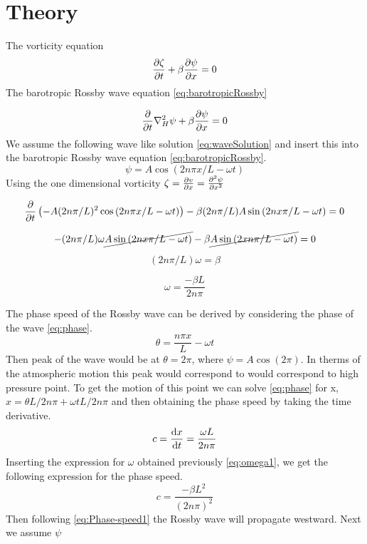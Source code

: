 \section{Theory}
The vorticity equation
\begin{equation}\label{eq:gov_vort}
    \pdv{\zeta}{t} + \beta \pdv{\psi}{x} = 0
\end{equation}
The barotropic Rossby wave equation \cref{eq:barotropicRossby}

\begin{equation}\label{eq:barotropicRossby}
    \frac{\partial}{\partial t}{} \nabla_H^2 \psi + \beta \pdv{\psi}{x} = 0 
\end{equation}
We assume the following wave like solution \cref{eq:waveSolution} and 
insert this into the barotropic Rossby wave equation \cref{eq:barotropicRossby}.
\begin{equation}\label{eq:waveSolution}
    \psi = A\cos{(2n\pi x /L - \omega t)}
\end{equation}
Using the one dimensional vorticity $\zeta = \pdv{v}{x} = \pdv[2]{\psi}{x}$ 

\begin{equation}
    \pdv{}{t} \left(-A (2n\pi/L)^2  \cos{(2n\pi x/L - \omega t)}\right) - \beta 
     (2n\pi/L) A \sin{(2n x\pi/L - \omega t) = 0}
\end{equation}

\begin{equation}
    -(2n\pi/L)\omega \cancel{A\sin{(2n x\pi/L - \omega t)}} - \beta 
    \cancel{A\sin{(2 xn\pi/L - \omega t)}} = 0
\end{equation}

\begin{equation}
    (2n\pi / L) \omega = \beta
\end{equation}

\begin{equation}\label{eq:omega1}
    \omega = \frac{-\beta L}{2n\pi} 
\end{equation}

The phase speed of the Rossby wave can be derived by considering the phase of
the wave \cref{eq:phase}.
\begin{equation}\label{eq:phase}
    \theta = \frac{n \pi x}{L} - \omega t
\end{equation} 
Then peak of the wave would be at $\theta = 2\pi$, where $\psi = A\cos{(2\pi)}$.
In therms of the atmospheric motion this peak would correspond to would
correspond to high pressure point. To get the motion of this point we can solve
\cref{eq:phase} for x, $x=\theta L / 2n \pi + \omega t L / 2n \pi$ and then
obtaining the phase speed by taking the time derivative. 
\begin{equation}
    c = \dv{x}{t} = \frac{\omega L}{2n\pi}
\end{equation} 
Inserting the expression for $\omega$ obtained previously \cref{eq:omega1}, we
get the following expression for the phase speed.
\begin{equation}\label{eq:Phase-speed1}
    c = \frac{-\beta L^2}{(2n\pi)^2}
\end{equation}
Then following \cref{eq:Phase-speed1} the Rossby wave will propagate westward.  
Next we assume $\psi $ 
